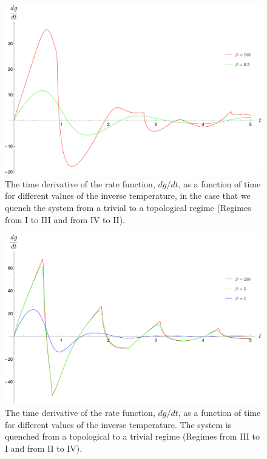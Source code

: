 \begin{figure}[h!]
\begin{center}
    \includegraphics[scale=0.3]{MDM_trivial_L_topo_+1.pdf}
    
    \caption{The time derivative of the rate function, $dg/dt$, as a function of time for different values of the inverse temperature, in the case that we quench the system from a trivial to a topological regime (Regimes from I to III and from IV to II).}
    \end{center}
\label{fig:MDM-trivial-L-topo-+1}
\end{figure}  

\begin{figure}[h]
\begin{center}
    \includegraphics[scale=0.3]{MDM_topo_-1_trivial_R.pdf}
    \caption{The time derivative of the rate function, $dg/dt$, as a function of time for different values of the inverse temperature. The system is quenched from a topological to a trivial regime (Regimes from III to I and from II to IV).}\end{center}
\label{fig:MDM-topo--1-trivial-R}
\end{figure}





